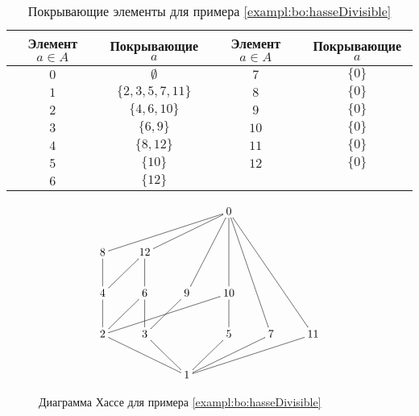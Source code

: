 \begin{table}
    \centering
    \begin{tabular}{c|c||c|c}
        \hline\hline
        Элемент $a\in A$ & Покрывающие $a$ & Элемент $a\in A$ & Покрывающие $a$ \\
        \hline\hline
        $0$ & $\emptyset$ 
                                & $7$ & $\{0\}$ \\
        $1$ & $\{2,3,5,7,11\}$ 
                                & $8$ & $\{0\}$ \\
        $2$ & $\{4,6,10\}$ 
                                & $9$ & $\{0\}$ \\
        $3$ & $\{6,9\}$ 
                                & $10$ & $\{0\}$ \\
        $4$ & $\{8,12\}$ 
                                & $11$ & $\{0\}$ \\
        $5$ & $\{10\}$ 
                                & $12$ & $\{0\}$ \\
        $6$ & $\{12\}$ 
                                &&\\
        \hline
    \end{tabular}
    \caption{Покрывающие элементы для примера \ref{exampl:bo:hasseDivisible}}
    \label{table:bo:hasseOverhead}
\end{table}

\begin{figure}
    \centering
    \[
        {\xymatrix{
            *{} 
                &*{}
                    &*{}
                        &0
                            &*{}
                                &*{}
                                    \\
            8 \ar@{-}[urrr]
                &12 \ar@{-}[urr]
                    &*{}
                        &*{}
                            &*{}
                                &*{}
                                    \\
            4 \ar@{-}[u]\ar@{-}[ur]
                &6 \ar@{-}[u]
                    &9 \ar@{-}[uur]
                        &10 \ar@{-}[uu]
                            &*{}
                                &*{}
                                    \\
            2 \ar@{-}[u] \ar@{-}[ur] \ar@{-}[urrr]
                &3 \ar@{-}[u] \ar@{-}[ur]
                    &*{}
                        &5 \ar@{-}[u]
                            &7 \ar@{-}[uuul]
                                &11 \ar@{-}[uuull]
                                    \\
            *{} 
                &*{}
                    &1 \ar@{-}[ull] \ar@{-}[ul] \ar@{-}[ur] \ar@{-}[urr] \ar@{-}[urrr]
                        &*{}
                            &*{}
                                &*{}
        }}
    \]
    \caption{Диаграмма Хассе для примера \ref{exampl:bo:hasseDivisible}}
    \label{fig:bo:hasseOnDiv}
\end{figure}    

